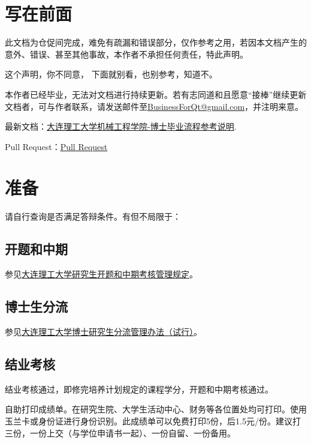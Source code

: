 \documentclass[12pt,a4paper]{ctexart}
\begin{document}
\clearpage{}
\section*{写在前面}
\label{sec:pre}

此文档为仓促间完成，难免有疏漏和错误部分，仅作参考之用，若因本文档产生的意外、错误、甚至其他事故，本作者不承担任何责任，特此声明。

这个声明，你不同意， 下面就别看，也别参考，知道不。

本作者已经毕业，无法对文档进行持续更新。若有志同道和且愿意“接棒”继续更新文档者，可与作者联系，请发送邮件至\href{mailto:BusinessForQt@gmail.com}{BusinessForQt@gmail.com}，并注明来意。

最新文档：\href{https://github.com/DrHanks91/DUTMePhDProcess}{大连理工大学机械工程学院-博士毕业流程参考说明}.

Pull Request：\href{https://github.com/DrHanks91/DUTMePhDProcess}{Pull Request}




\section{准备}
请自行查询是否满足答辩条件。有但不局限于：

\subsection{开题和中期}
\label{sec:kaiti}


参见\href{https://gs.dlut.edu.cn/info/1031/9635.htm}{大连理工大学研究生开题和中期考核管理规定}。

\subsection{博士生分流}
\label{sec:fenliu}

参见\href{https://gs.dlut.edu.cn/info/1079/8943.htm}{大连理工大学博士研究生分流管理办法（试行）}。

\subsection{结业考核}
\label{sec:jieye}

结业考核通过，即修完培养计划规定的课程学分，开题和中期考核通过。

自助打印成绩单。在研究生院、大学生活动中心、财务等各位置处均可打印。使用玉兰卡或身份证进行身份识别。此成绩单可以免费打印5份，后1.5元/份。建议打三份，一份上交（与学位申请书一起）、一份自留、一份备用。
\end{document}
